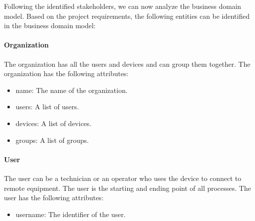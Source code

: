 


Following the identified stakeholders, we can now analyze the business domain model.
Based on the project requirements, 
the following entities can be identified in the business domain model:

\paragraph{Organization}
The organization has all the users and devices and can group them together.
The organization has the following attributes:
\begin{itemize}
    \item name: The name of the organization.
    \item users: A list of users.
    \item devices: A list of devices.
    \item groups: A list of groups.
\end{itemize}

\paragraph{User}
The user can be a technician or an operator who uses the device to connect to remote equipment.
The user is the starting and ending point of all processes.
The user has the following attributes:
\begin{itemize}
    \item username: The identifier of the user.
\end{itemize}

